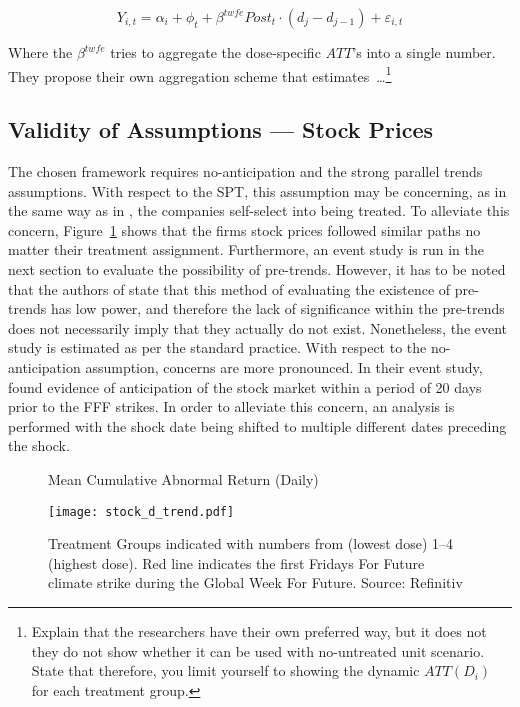 \documentclass[12pt]{article}
\begin{document}
\begin{equation}
    Y_{i,t} = \alpha_i + \phi_t +  \beta^{twfe} Post_t \cdot (d_j - d_{j-1}) + \varepsilon_{i,t}
\end{equation}

Where the $\beta^{twfe}$ tries to aggregate the dose-specific $ATT$'s into a single number. They propose their own aggregation scheme that estimates\ \dots\footnote{Explain that the researchers have their own preferred way, but it does not they do not show whether it can be used with no-untreated unit scenario. State that therefore, you limit yourself to showing the dynamic $ATT(D_i)$ for each treatment group.}

\subsection{Validity of Assumptions --- Stock Prices}

The chosen framework requires no-anticipation and the strong parallel trends assumptions. With respect to the SPT, this assumption may be concerning, as in the same way as in \textcite{koenigImpulsePurchasesGun2023}, the companies self-select into being treated. To alleviate this concern, Figure~\ref{fig:stock_trend} shows that the firms stock prices followed similar paths no matter their treatment assignment.
Furthermore, an event study is run in the next section to evaluate the possibility of pre-trends. However, it has to be noted that the authors of \textcite{callawayDifferenceinDifferencesContinuousTreatment2025} state that this method of evaluating the existence of pre-trends has low power, and therefore the lack of significance within the pre-trends does not necessarily imply that they actually do not exist. Nonetheless, the event study is estimated as per the standard practice.
With respect to the no-anticipation assumption, concerns are more pronounced. In their event study, \textcite{schusterStockPriceReactions2023} found evidence of anticipation of the stock market within a period of 20 days prior to the FFF strikes. In order to alleviate this concern, an analysis is performed with the shock date being shifted to multiple different dates preceding the shock.

\begin{figure}[t]
    \caption{Mean Cumulative Abnormal Return (Daily)}\label{fig:stock_trend}
    \centering
    \texttt{[image: stock\_d\_trend.pdf]}
    \captionsetup{font=footnotesize}
    \caption*{Treatment Groups indicated with numbers from (lowest dose) 1--4 (highest dose). Red line indicates the first Fridays For Future climate strike during the Global Week For Future. Source: Refinitiv}
\end{figure}
\end{document}
